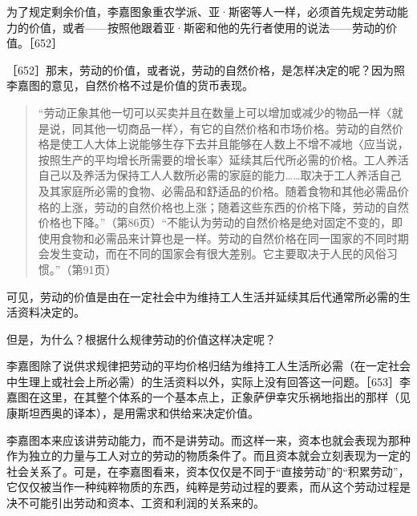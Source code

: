 
为了规定剩余价值，李嘉图象重农学派、亚·斯密等人一样，必须首先规定劳动能力的价值，或者——按照他跟着亚·斯密和他的先行者使用的说法——劳动的价值。［652］

［652］那末，劳动的价值，或者说，劳动的自然价格，是怎样决定的呢？因为照李嘉图的意见，自然价格不过是价值的货币表现。

\begin{quote}{“劳动正象其他一切可以买卖并且在数量上可以增加或减少的物品一样〈就是说，同其他一切商品一样〉，有它的自然价格和市场价格。劳动的自然价格是使工人大体上说能够生存下去并且能够在人数上不增不减地〈应当说，按照生产的平均增长所需要的增长率〉延续其后代所必需的价格。工人养活自己以及养活为保持工人人数所必需的家庭的能力……取决于工人养活自己及其家庭所必需的食物、必需品和舒适品的价格。随着食物和其他必需品价格的上涨，劳动的自然价格也上涨；随着这些东西的价格下降，劳动的自然价格也下降。”（第86页）“不能认为劳动的自然价格是绝对固定不变的，即使用食物和必需品来计算也是一样。劳动的自然价格在同一国家的不同时期会发生变动，而在不同的国家会有很大差别。它主要取决于人民的风俗习惯。”（第91页）}\end{quote}

可见，劳动的价值是由在一定社会中为维持工人生活并延续其后代通常所必需的生活资料决定的。

但是，为什么？根据什么规律劳动的价值这样决定呢？

李嘉图除了说供求规律把劳动的平均价格归结为维持工人生活所必需（在一定社会中生理上或社会上所必需）的生活资料以外，实际上没有回答这一问题。［653］李嘉图在这里，在其整个体系的一个基本点上，正象萨伊幸灾乐祸地指出的那样（见康斯坦西奥的译本），是用需求和供给来决定价值。

李嘉图本来应该讲劳动能力，而不是讲劳动。而这样一来，资本也就会表现为那种作为独立的力量与工人对立的劳动的物质条件了。而且资本就会立刻表现为一定的社会关系了。可是，在李嘉图看来，资本仅仅是不同于“直接劳动”的“积累劳动”，它仅仅被当作一种纯粹物质的东西，纯粹是劳动过程的要素，而从这个劳动过程是决不可能引出劳动和资本、工资和利润的关系来的。

